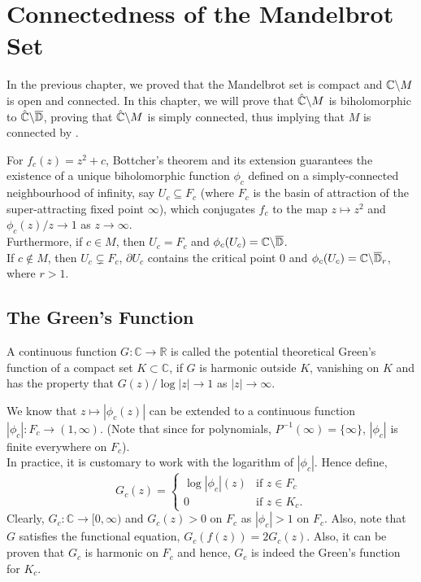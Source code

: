 \chapter{Connectedness of the Mandelbrot Set}
In the previous chapter, we proved that the Mandelbrot set is compact and \( \mathbb{C}\backslash M \)
is open and connected. In this chapter, we will prove that \( \hat{\mathbb{C}}\backslash M \) is biholomorphic
to \( \hat{\mathbb{C}}\backslash \overline{\mathbb{D}}  \), proving that \( \hat{\mathbb{C}}\backslash M \) is simply connected, thus implying that \( M \) is connected by .

For \( f_c(z)=z^2+c\), Bottcher's theorem and its extension
guarantees the existence of a unique biholomorphic function 
\( \phi_c \) defined on a
simply-connected neighbourhood of infinity, say \( U_c \subseteq F_c\)
(where \( F_c \) is the basin of attraction of the
super-attracting fixed point \( \infty \)), which
conjugates \( f_c \) to the map \( z\mapsto z^2 \) and 
\( \phi_c(z) /z \to 1 \) as \( z\to \infty \).\\
Furthermore, if \(c\in M \), then \( U_c=F_c \) and 
\( \phi_c(U_c)=\mathbb{C} \backslash \overline{\mathbb{D}}  \).\\
If \( c\not\in M \), then \( U_c\subsetneq F_c \),
\( \partial U_c \) contains the critical point \( 0 \) and
\( \phi_c(U_c)=\mathbb{C}\backslash \overline{\mathbb{D}}_r  \), where \( r>1 \).

\section{The Green's Function}
\begin{definition}
	A continuous function \( G:\mathbb{C}\to \mathbb{R} \) is called the 
	potential theoretical Green's function of a compact set \( K\subset \mathbb{C} \), 
	if \( G \) is harmonic outside \( K \), vanishing on \( K \) and has the property 
	that \( G(z) /\log |z|\to 1 \) as \( |z|\to \infty \).
\end{definition}

\noindent We know that \( z\mapsto |\phi_c(z)| \) can be extended to
a continuous function \( |\phi_c|:F_c\to (1,\infty) \).
(Note that since for polynomials, \( P^{-1}(\infty)=\{\infty\} \),
\( |\phi_c| \) is finite everywhere on \( F_c \)).\\
In practice, it is customary to work with the logarithm of \( |\phi_c| \).
Hence define, \[
   	G_c(z) =
   \begin{cases}
		\log |\phi_c|(z) & \text{if } z \in F_c\\
   	0 & \text{if } z \in K_c.
   \end{cases}
\]
Clearly, \( G_c:\mathbb{C}\to [0,\infty) \) and \( G_c(z)>0 \) on \( F_c \) as \( |\phi_c| >1 \) on \( F_c \).
Also, note that \( G \) satisfies the functional equation, \( G_c(f(z))=2G_c(z) \). Also, it can be proven that \( G_c \) is harmonic on \( F_c \) and hence, \( G_c \) is indeed the Green's function for \( K_c \).


